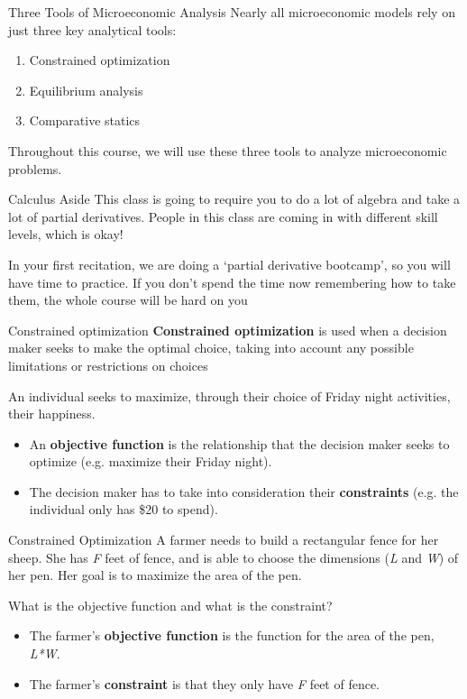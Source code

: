 \documentclass[11pt,t]{beamer}
\begin{document}
\begin{frame}{Three Tools of Microeconomic Analysis}
  Nearly all microeconomic models rely on just three key analytical tools:
  \begin{enumerate}
    \item Constrained optimization
    \item Equilibrium analysis
    \item Comparative statics
  \end{enumerate}

  \bigskip
  Throughout this course, we will use these three tools to analyze microeconomic problems.
\end{frame}

\begin{frame}{Calculus Aside}
  This class is going to require you to do a lot of algebra and take a lot of partial derivatives. People in this class are coming in with different skill levels, which is okay!

  \bigskip
  In your first recitation, we are doing a `partial derivative bootcamp', so you will have time to practice. If you don't spend the time now remembering how to take them, the whole course will be hard on you
\end{frame}

\begin{frame}{Constrained optimization}
  \textbf{Constrained optimization} is used when a decision maker seeks to make the optimal choice, taking into account any possible limitations or restrictions on choices

  \bigskip
  
  \bigskip
  An individual seeks to maximize, through their choice of Friday night activities, their happiness.

  \begin{itemize}
    \item An \textbf{objective function} is the relationship that the decision maker seeks to optimize (e.g. maximize their Friday night).
    \item  The decision maker has to take into consideration their \textbf{constraints} (e.g. the individual only has \$20 to spend).
  \end{itemize}
\end{frame}

\begin{frame}{Constrained Optimization}
  A farmer needs to build a rectangular fence for her sheep. She has \textit{F} feet of fence, and is able to choose the dimensions (\textit{L} and \textit{W}) of her pen. Her goal is to maximize the area of the pen.

  \bigskip
  What is the objective function and what is the constraint?

  \pause
  \begin{itemize}
    \item The farmer's \textbf{objective function} is the function for the area of the pen, \textit{L*W}.
    \item The farmer's \textbf{constraint} is that they only have \textit{F} feet of fence.
  \end{itemize}
\end{frame}
\end{document}
